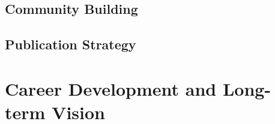 \documentclass[11pt,a4paper]{article}
\begin{document}
    
    
    
    \subsection{Community Building}
    
    
    
    \subsection{Publication Strategy}
    
\section{Career Development and Long-term Vision}
\label{sec:career}


\end{document}
